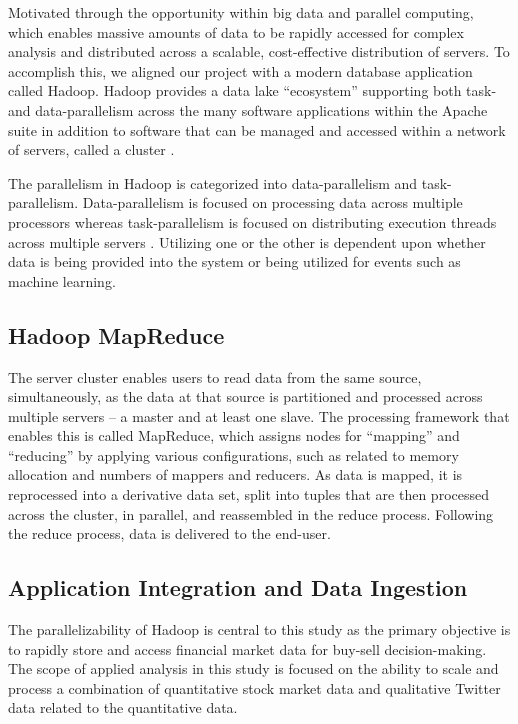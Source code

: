 \documentclass[journal]{IEEEtran}
\begin{document}
	Motivated through the opportunity within big data and parallel computing,
	which enables massive amounts of data to be rapidly accessed for complex
	analysis and distributed across a scalable, cost-effective distribution of
	servers. To accomplish this, we aligned our project with a modern database
	application called Hadoop. Hadoop provides a data lake ``ecosystem'' 
	supporting both task- and data-parallelism across the many software
	applications within the Apache suite in addition to software that can 
	be managed and accessed within a network of servers, called a cluster \cite{Intel, BigDataComputing}.
	
	The parallelism in Hadoop is categorized into data-parallelism and task-parallelism.
	Data-parallelism is focused on processing data across multiple processors whereas
	task-parallelism is focused on distributing execution threads across multiple servers \cite{Parallelism}. Utilizing one or the other is dependent upon whether data is 
	being provided into the system or being utilized for events such as machine learning.
	
	\subsection{Hadoop MapReduce}
	
	The server cluster enables users to read data from the same source,
	simultaneously, as the data at that source is partitioned and
	processed across multiple servers – a master and at least one slave. 
	The processing framework that enables this is called MapReduce, 
	which assigns nodes for ``mapping'' and ``reducing'' by applying 
	various configurations, such as related to memory allocation and numbers
	of mappers and reducers. As data is mapped, it is reprocessed into a derivative 
	data set, split into tuples that are then processed across the cluster, in parallel, and reassembled in the reduce process. Following the reduce process, data is delivered to 
	the end-user.
	
	\subsection{Application Integration and Data Ingestion}
	
	The parallelizability of Hadoop is central to this study as the primary
	objective is to rapidly store and access financial market data for 
	buy-sell decision-making. 
	The scope of applied analysis in this study is focused on the ability to
	scale and process a combination of quantitative stock market data and
	qualitative Twitter data related to the quantitative data. 
	
\end{document}
